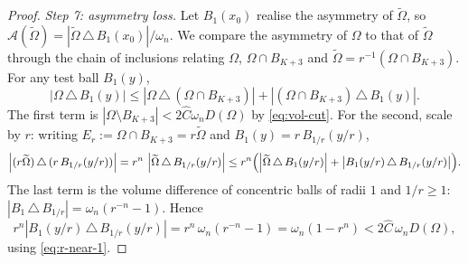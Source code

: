 \documentclass[11pt]{amsart}
\theoremstyle{definition}
\newcommand{\Om}{\Omega}
\newcommand{\Fr}{\mathcal A}
\newcommand{\abs}[1]{\left|#1\right|}
\newcommand{\Otilde}{\widetilde{\Omega}}
\begin{document}
\begin{proof}
\smallskip
\emph{Step 7: asymmetry loss.}
Let $B_1(x_0)$ realise the asymmetry of $\Otilde$, so
$\Fr(\Otilde)=\abs{\Otilde\,\triangle\,B_1(x_0)}/\omega_n$. We compare the
asymmetry of $\Om$ to that of $\Otilde$ through the chain of inclusions
relating $\Om$, $\Om\cap B_{K+3}$ and $\Otilde=r^{-1}(\Om\cap B_{K+3})$.
For any test ball $B_1(y)$,
\[
   \abs{\Om\,\triangle\,B_1(y)}
   \le\abs{\Om\,\triangle\,(\Om\cap B_{K+3})}
     +\abs{(\Om\cap B_{K+3})\,\triangle\,B_1(y)}.
\]
The first term is $\abs{\Om\setminus B_{K+3}}<2\widehat C\omega_n D(\Om)$
by \eqref{eq:vol-cut}.
For the second, scale by $r$: writing
$E_r:=\Om\cap B_{K+3}=r\Otilde$ and $B_1(y)=r\,B_{1/r}(y/r)$,
\[
   \abs{(r\Otilde)\,\triangle\,(r\,B_{1/r}(y/r))}
   =r^n\,\abs{\Otilde\,\triangle\,B_{1/r}(y/r)}
   \le r^n\Bigl(\abs{\Otilde\,\triangle\,B_1(y/r)}
              +\abs{B_1(y/r)\,\triangle\,B_{1/r}(y/r)}\Bigr).
\]
The last term is the volume difference of concentric balls of radii $1$
and $1/r\ge1$:
$\abs{B_1\,\triangle\,B_{1/r}}=\omega_n(r^{-n}-1)$. Hence
\[
   r^n\abs{B_1(y/r)\,\triangle\,B_{1/r}(y/r)}
   =r^n\,\omega_n(r^{-n}-1)=\omega_n(1-r^n)
   <2\widehat C\,\omega_n D(\Om),
\]
using \eqref{eq:r-near-1}.

\end{proof}
\end{document}
